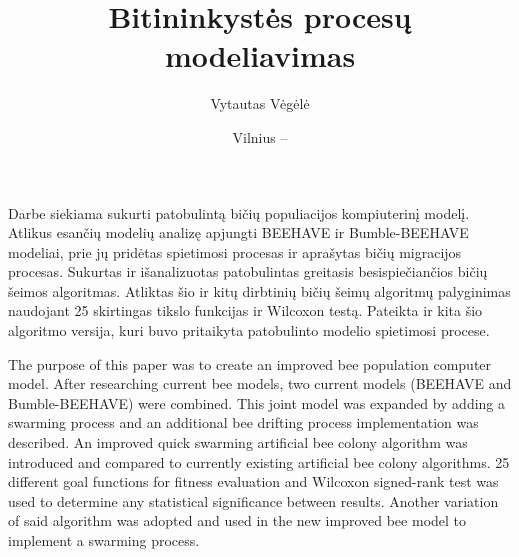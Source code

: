 \documentclass{VUMIFPSmagistrinis}
\title{Bitininkystės procesų modeliavimas}
\author{Vytautas Vėgėlė}
\date{Vilnius -- \the\year}
\begin{document}
\maketitle

\tableofcontents


Darbe siekiama sukurti patobulintą bičių populiacijos kompiuterinį modelį. Atlikus esančių modelių analizę apjungti BEEHAVE ir Bumble-BEEHAVE modeliai, prie jų pridėtas spietimosi procesas ir aprašytas bičių migracijos procesas. Sukurtas ir išanalizuotas patobulintas greitasis besispiečiančios bičių šeimos algoritmas. Atliktas šio ir kitų dirbtinių bičių šeimų algoritmų palyginimas naudojant 25 skirtingas tikslo funkcijas ir Wilcoxon testą. Pateikta ir kita šio algoritmo versija, kuri buvo pritaikyta patobulinto modelio spietimosi procese.

The purpose of this paper was to create an improved bee population computer model. After researching current bee models, two current models (BEEHAVE and Bumble-BEEHAVE) were combined. This joint model was expanded by adding a swarming process and an additional bee drifting process implementation was described. An improved quick swarming artificial bee colony algorithm was introduced and compared to currently existing artificial bee colony algorithms. 25 different goal functions for fitness evaluation and Wilcoxon signed-rank test was used to determine any statistical significance between results. Another variation of said algorithm was adopted and used in the new improved bee model to implement a swarming process.
\end{document}
